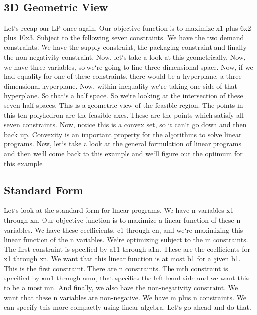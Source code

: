 \subsection{3D Geometric View}
Let`s recap our LP once again.
Our objective function is to maximize x1 plus 6x2 plus 10x3.
Subject to the following seven constraints.
We have the two demand constraints.
We have the supply constraint, the packaging constraint and finally the non-negativity constraint.
Now, let`s take a look at this geometrically.
Now, we have three variables, so we`re going to line three dimensional space.
Now, if we had equality for one of these constraints, there would be a hyperplane, a three dimensional hyperplane.
Now, within inequality we`re taking one side of that hyperplane.
So that`s a half space.
So we`re looking at the intersection of these seven half spaces.
This is a geometric view of the feasible region.
The points in this ten polyhedron are the feasible axes.
These are the points which satisfy all seven constraints.
Now, notice this is a convex set, so it can`t go down and then back up.
Convexity is an important property for the algorithms to solve linear programs.
Now, let`s take a look at the general formulation of linear programs and then we`ll come back to this example and we`ll figure out the optimum for this example.

\subsection{Standard Form}
Let`s look at the standard form for linear programs.
We have n variables x1 through xn.
Our objective function is to maximize a linear function of these n variables.
We have these coefficients, c1 through cn, and we`re maximizing this linear function of the n variables.
We`re optimizing subject to the m constraints.
The first constraint is specified by a11 through a1n.
These are the coefficients for x1 through xn.
We want that this linear function is at most b1 for a given b1.
This is the first constraint.
There are n constraints.
The mth constraint is specified by am1 through amn, that specifies the left hand side and we want this to be a most mn.
And finally, we also have the non-negativity constraint.
We want that these n variables are non-negative.
We have m plus n constraints.
We can specify this more compactly using linear algebra.
Let`s go ahead and do that.

